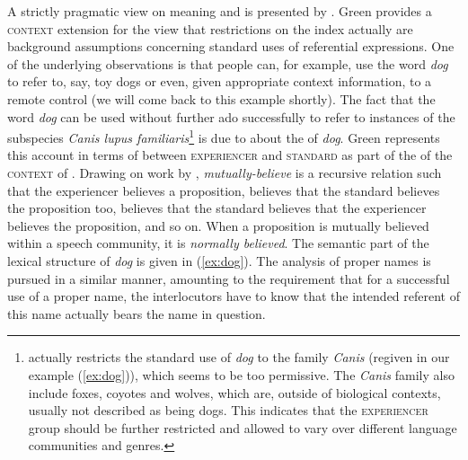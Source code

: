 \documentclass[output=paper,biblatex,babelshorthands,newtxmath,draftmode,colorlinks,citecolor=brown]{langscibook}
\begin{document}
A strictly pragmatic view on meaning and  is presented by \citet{Green:1996}.
%
Green provides a \textsc{context} extension for the view that restrictions on the index actually are background assumptions concerning standard uses of referential expressions.
%
One of the underlying observations is that people can, for example, use the word \textit{dog} to refer to, say, toy dogs or even, given appropriate context information, to a remote control (we will come back to this example shortly).
%
The fact that the word \textit{dog} can be used without further ado successfully to refer to instances of the subspecies \textit{Canis lupus familiaris}\footnote{\label{fn:canis}\citet[Example (73)]{Green:1996} actually restricts the standard use of \textit{dog} to the family \textit{Canis} (regiven in our example (\ref{ex:dog})), which seems to be too permissive. The \textit{Canis} family also include foxes, coyotes and wolves, which are, outside of biological contexts, usually not described as being dogs. This indicates that the \textsc{experiencer} group should be further restricted and allowed to vary over different language communities and genres.} is due to  about the  of \textit{dog}.
%
Green represents this account in terms of  between \textsc{experiencer} and \textsc{standard} as part of the  of the \textsc{context} of .
%
Drawing on work by \citet{Cohen:Levesque:1990},  \textit{mutually-believe} is a recursive relation such that the experiencer believes a proposition, believes that the standard believes the proposition too, believes that the standard believes that the experiencer believes the proposition, and so on. 
%
When a proposition is mutually believed within a speech community, it is \emph{normally believed}.
%
The semantic part of the lexical structure of \textit{dog} is given in (\ref{ex:dog}).
%
The analysis of proper names is pursued in a similar manner, amounting to the requirement that for a successful use of a proper name, the interlocutors have to know that the intended referent of this name actually bears the name in question.\vspace{-\baselineskip}
\largerpage[1]

\ea
\label{ex:dog}
\z
\end{document}
